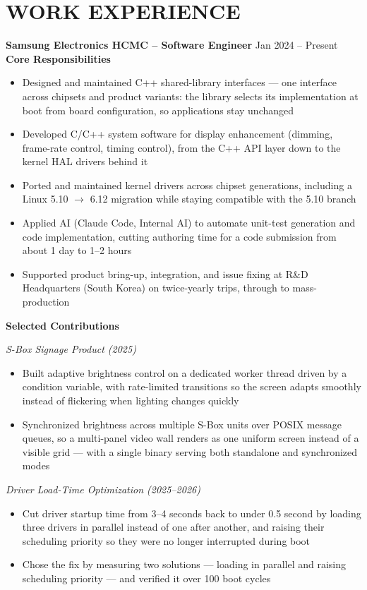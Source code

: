 \documentclass[a4paper,10pt]{article}
\newcommand{\project}[1]{\vspace{2pt}\textit{#1}\vspace{1pt}}
\begin{document}
\section*{WORK EXPERIENCE}

\textbf{Samsung Electronics HCMC -- Software Engineer} \hfill Jan 2024 -- Present \\[2pt]
\textbf{Core Responsibilities}
\begin{itemize}
\item Designed and maintained C++ shared-library interfaces --- one interface across chipsets
      and product variants: the library selects its implementation at boot from board
      configuration, so applications stay unchanged
\item Developed C/C++ system software for display enhancement (dimming, frame-rate control,
      timing control), from the C++ API layer down to the kernel HAL drivers behind it
\item Ported and maintained kernel drivers across chipset generations, including a
      Linux 5.10 $\rightarrow$ 6.12 migration while staying compatible with the 5.10 branch
\item Applied AI (Claude Code, Internal AI) to automate unit-test generation and code implementation,
      cutting authoring time for a code submission from about 1 day to 1--2 hours
\item Supported product bring-up, integration, and issue fixing at R\&D Headquarters
      (South Korea) on twice-yearly trips, through to mass-production
\end{itemize}

\vspace{2pt}
\textbf{Selected Contributions}

\project{S-Box Signage Product (2025)}
\begin{itemize}
    \item Built adaptive brightness control on a dedicated worker thread driven by a condition
          variable, with rate-limited transitions so the screen adapts smoothly instead of
          flickering when lighting changes quickly
    \item Synchronized brightness across multiple S-Box units over POSIX message queues, so a
          multi-panel video wall renders as one uniform screen instead of a visible grid ---
          with a single binary serving both standalone and synchronized modes
\end{itemize}

\project{Driver Load-Time Optimization (2025--2026)}
\begin{itemize}
    \item Cut driver startup time from 3--4 seconds back to under 0.5 second by loading three
          drivers in parallel instead of one after another, and raising their scheduling
          priority so they were no longer interrupted during boot
    \item Chose the fix by measuring two solutions --- loading in parallel and
          raising scheduling priority --- and verified it over 100 boot cycles
\end{itemize}
\end{document}
